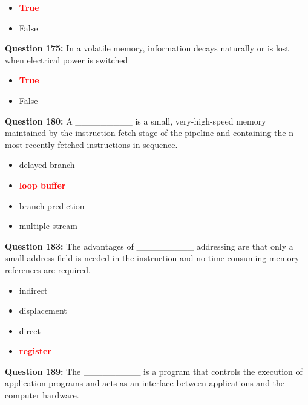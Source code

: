 \documentclass[12pt,a4paper]{article}
\begin{document}
\begin{itemize}
    \item[\textbf{A.}] \textcolor{red}{\textbf{True}}
    \item[\textbf{B.}] False
\end{itemize}

\vspace{0.5cm}

\textbf{Question 175:} In a volatile memory, information decays naturally or is lost when electrical power is switched

\begin{itemize}
    \item[\textbf{A.}] \textcolor{red}{\textbf{True}}
    \item[\textbf{B.}] False
\end{itemize}

\vspace{0.5cm}

\textbf{Question 180:} A _________ is a small, very-high-speed memory maintained by the instruction fetch stage of the pipeline and containing the n most recently fetched instructions in sequence.

\begin{itemize}
    \item[\textbf{A.}] delayed branch
    \item[\textbf{B.}] \textcolor{red}{\textbf{loop buffer}}
    \item[\textbf{C.}] branch prediction
    \item[\textbf{D.}] multiple stream
\end{itemize}

\vspace{0.5cm}

\textbf{Question 183:} The advantages of _________ addressing are that only a small address field is needed in the instruction and no time-consuming memory references are required.

\begin{itemize}
    \item[\textbf{A.}] indirect
    \item[\textbf{B.}] displacement
    \item[\textbf{C.}] direct
    \item[\textbf{D.}] \textcolor{red}{\textbf{register}}
\end{itemize}

\vspace{0.5cm}

\textbf{Question 189:} The _________ is a program that controls the execution of application programs and acts as an interface between applications and the computer hardware.
\end{document}
